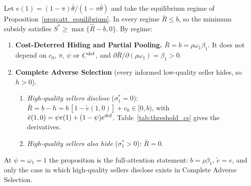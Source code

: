 \label{prop:threshold}
Let $e(1)=(1-\pi)\bar\theta/(1-\pi\bar\theta)$ and take the equilibrium regime of Proposition~\ref{prop:att_equilibrium}. In every regime $\bar R\le b$, so the minimum subsidy satisfies $S^*\ge\max\{\hat R-b,0\}$. By regime:
\begin{enumerate}[label=(\roman*)]
    \item \textbf{Cost-Deterred Hiding and Partial Pooling.} $\bar R=b=\rho\omega_1\beta_1$. It does not depend on $c_0$, $\pi$, $\psi$ or $C^{\rm def}$, and $\partial\bar R/\partial(\rho\omega_1)=\beta_1>0$.
    \item \textbf{Complete Adverse Selection} (every informed low-quality seller hides, so $h>0$).
    \begin{enumerate}[label=(\alph*)]
        \item \emph{High-quality sellers disclose} ($\sigma_1^*=0$): $\bar R=b-h=b\,[1-\tilde e(1,0)]+c_0\in[0,b)$, with $\tilde e(1,0)=\psi e(1)+(1-\psi)e^{\rm def}$. Table~\ref{tab:threshold_cs} gives the derivatives.
        \item \emph{High-quality sellers also hide} ($\sigma_1^*>0$): $\bar R=0$.
    \end{enumerate}
\end{enumerate}
At $\psi=\omega_1=1$ the proposition is the full-attention statement: $b=\rho\beta_1$, $\tilde e=e$, and only the case in which high-quality sellers disclose exists in Complete Adverse Selection.
